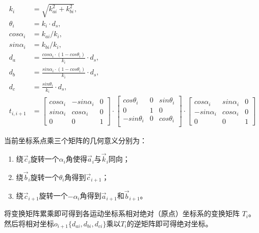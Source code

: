 \begin{align}
    k_i &= \sqrt{k_{ai} ^ 2 + k_{bi} ^ 2}, \\
    \theta_i &= k_i \cdot d_s, \\
    cos\alpha_i &= k_{ai} / k_i, \\
    sin\alpha_i &= k_{bi} / k_i, \\
    d_a &= \frac{cos\alpha_i \cdot (1 - cos\theta_i)}{k_i} \cdot d_s, \\
    d_b &= \frac{sin\alpha_i \cdot (1 - cos\theta_i)}{k_i} \cdot d_s, \\
    d_c &= \frac{sin\theta_i}{k_i} \cdot d_s, \\
    t_{i, i+1} &= \left[
        \begin{matrix}
            cos \alpha_i & -sin \alpha_i & 0 \\
            sin \alpha_i & cos \alpha_i & 0 \\
            0 & 0 & 1
        \end{matrix}
        \right]
        \cdot
        \left[
        \begin{matrix}
            cos \theta_i & 0 & sin \theta_i \\
            0 & 1 & 0 \\
            -sin \theta_i & 0 & cos \theta_i \\
        \end{matrix}
        \right]
        \cdot
        \left[
        \begin{matrix}
            cos \alpha_i & sin \alpha_i & 0 \\
            -sin \alpha_i & cos \alpha_i & 0 \\
            0 & 0 & 1
        \end{matrix}
        \right] \label{alg:reconstruction}
\end{align}

当前坐标系点乘三个矩阵的几何意义分别为：\\
\begin{enumerate}
    \item 绕$\vec c_i$旋转一个$\alpha_i$角使得$\vec a_i$与$\vec k_i$同向；
    \item 绕$\vec b_i$旋转一个$\theta_i$角得到$\vec c_{i+1}$；
    \item 绕$\vec c_{i+1}$旋转一个$-\alpha_i$角得到$\vec a_{i+1}$和$\vec b_{i+1}$。
\end{enumerate}

将变换矩阵累乘即可得到各运动坐标系相对绝对（原点）坐标系的变换矩阵 $T_i$。
然后将相对坐标$o_{i+1} \{d_{ai}, d_{bi}, d_{ci}\}$乘以$T_i$的逆矩阵即可得绝对坐标。

